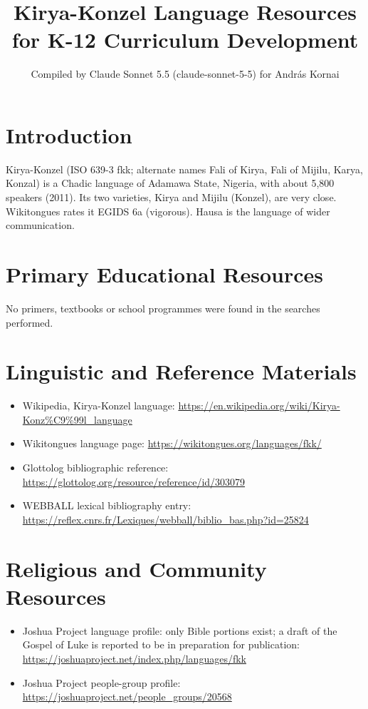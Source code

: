 \documentclass[12pt]{article}
\title{Kirya-Konzel Language Resources for K-12 Curriculum Development}
\author{Compiled by Claude Sonnet 5.5 (claude-sonnet-5-5) for Andr\'as Kornai}
\date{}
\begin{document}
\maketitle

\section{Introduction}
Kirya-Konzel (ISO 639-3 fkk; alternate names Fali of Kirya, Fali of Mijilu, Karya, Konzal) is a Chadic language of Adamawa State, Nigeria, with about 5,800 speakers (2011). Its two varieties, Kirya and Mijilu (Konzel), are very close. Wikitongues rates it EGIDS 6a (vigorous). Hausa is the language of wider communication.

\section{Primary Educational Resources}
No primers, textbooks or school programmes were found in the searches performed.

\section{Linguistic and Reference Materials}
\begin{itemize}
\item Wikipedia, Kirya-Konzel language: \url{https://en.wikipedia.org/wiki/Kirya-Konz%C9%99l_language}
\item Wikitongues language page: \url{https://wikitongues.org/languages/fkk/}
\item Glottolog bibliographic reference: \url{https://glottolog.org/resource/reference/id/303079}
\item WEBBALL lexical bibliography entry: \url{https://reflex.cnrs.fr/Lexiques/webball/biblio_bas.php?id=25824}
\end{itemize}

\section{Religious and Community Resources}
\begin{itemize}
\item Joshua Project language profile: only Bible portions exist; a draft of the Gospel of Luke is reported to be in preparation for publication: \url{https://joshuaproject.net/index.php/languages/fkk}
\item Joshua Project people-group profile: \url{https://joshuaproject.net/people_groups/20568}
\end{itemize}
\end{document}
